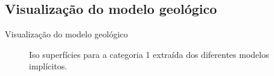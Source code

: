 \documentclass[aspectratio=169]{beamer}
\begin{document}
\subsection{Visualização do modelo geológico}

\begin{frame}{Visualização do modelo geológico}
\begin{figure}[H]
	\caption{Iso superfícies para a categoria 1 extraída dos diferentes modelos implícitos.} \label{isosup}
	\centering
\end{figure}
\end{frame}
\end{document}
